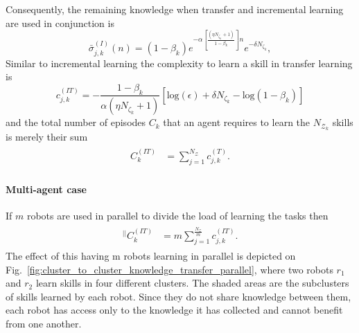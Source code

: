 Consequently, the remaining knowledge when transfer and incremental learning are used in conjunction is
\begin{equation*}\label{eq:remaining_knowledge__ITL}
	\bar{\sigma}^{(I)}_{j,k}(n) = \left(1- \beta_k\right) e^{-\alpha  \left[\frac{ \left(\eta N_{\zeta_k}+1\right)}{1 - \beta_k}\right] n} e^{-\delta N_{\zeta_k}},
\end{equation*}
Similar to incremental learning the complexity to learn a skill in transfer learning is
\begin{equation}\label{eq:skill_complexity_TL}
	c^{(IT)}_{j,k} = -\frac{1 - \beta_{k}}{\alpha (\eta N_{\zeta_k}+ 1)}\left[\text{log}(\epsilon) + \delta N_{\zeta_k} - \text{log}(1 - \beta_{k})\right]
\end{equation}
and the total number of episodes  $ C_k $ that an agent requires to learn the $N_{\mathcal{Z}_k}$ skills is merely their sum
\begin{align}\label{eq:total_episodes_transfer}
	\begin{split}
		C^{(IT)}_k &= \sum^{N_{\mathcal{Z}}}_{j=1} c^{(T)}_{j,k}.
	\end{split}
\end{align}

\paragraph*{Multi-agent case}
If $m$ robots are used in parallel to divide the load of learning the tasks then
\begin{align}
	\begin{split}
		{}^{\lvert \rvert}C^{(IT)}_k &= m\sum^{\frac{N_{\mathcal{Z}}}{m}}_{j=1} c^{(IT)}_{j,k}.
	\end{split}
\end{align}
The effect of this having m robots learning in parallel is depicted on Fig.~\ref{fig:cluster_to_cluster_knowledge_transfer_parallel}, where two robots $ r_1$ and $r_2$ learn skills in four different clusters. The shaded areas are the subclusters of skills learned by each robot. Since they do not share knowledge between them, each robot has access only to the knowledge it has collected and cannot benefit from one another. 

